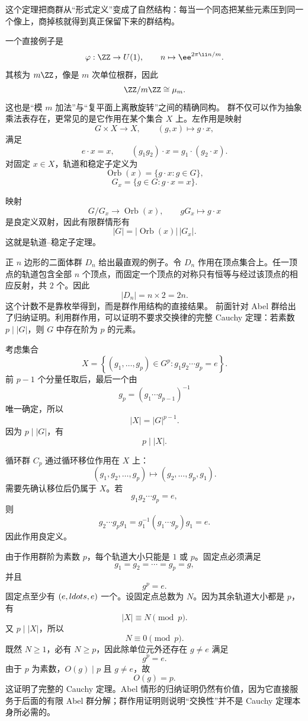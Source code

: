 这个定理把商群从“形式定义”变成了自然结构：每当一个同态把某些元素压到同一个像上，商掉核就得到真正保留下来的群结构。

一个直接例子是
\[
\varphi:\ZZ\to U(1),
\qquad
n\mapsto \ee^{2\pi\ii n/m}.
\]
其核为 $m\ZZ$，像是 $m$ 次单位根群，因此
\[
\ZZ/m\ZZ\cong \mu_m.
\]
这也是“模 $m$ 加法”与“复平面上离散旋转”之间的精确同构。
群不仅可以作为抽象乘法表存在，更常见的是它作用在某个集合 $X$ 上。左作用是映射
\[
G\times X\to X,
\qquad (g,x)\mapsto g\cdot x,
\]
满足
\[
e\cdot x=x,
\qquad
(g_1g_2)\cdot x=g_1\cdot(g_2\cdot x).
\]
对固定 $x\in X$，轨道和稳定子定义为
\[
\operatorname{Orb}(x)=\{g\cdot x:g\in G\},
\]
\[
G_x=\{g\in G:g\cdot x=x\}.
\]

映射
\[
G/G_x\to\operatorname{Orb}(x),
\qquad
gG_x\mapsto g\cdot x
\]
是良定义双射，因此有限群情形有
\begin{equation*}{
|G|=|\operatorname{Orb}(x)|\,|G_x|
}.\end{equation*}
这就是轨道--稳定子定理。

正 $n$ 边形的二面体群 $D_n$ 给出最直观的例子。令 $D_n$ 作用在顶点集合上。任一顶点的轨道包含全部 $n$ 个顶点，而固定一个顶点的对称只有恒等与经过该顶点的相应反射，共 $2$ 个。因此
\[
|D_n|=n\times2=2n.
\]
这个计数不是靠枚举得到，而是群作用结构的直接结果。
前面针对 Abel 群给出了归纳证明。利用群作用，可以证明不要求交换律的完整 Cauchy 定理：若素数 $p\mid|G|$，则 $G$ 中存在阶为 $p$ 的元素。

考虑集合
\[
X=\left\{(g_1,\ldots,g_p)\in G^p:
 g_1g_2\cdots g_p=e\right\}.
\]
前 $p-1$ 个分量任取后，最后一个由
\[
g_p=(g_1\cdots g_{p-1})^{-1}
\]
唯一确定，所以
\[
|X|=|G|^{p-1}.
\]
因为 $p\mid|G|$，有
\[
p\mid|X|.
\]

循环群 $C_p$ 通过循环移位作用在 $X$ 上：
\[
(g_1,g_2,\ldots,g_p)
\mapsto
(g_2,\ldots,g_p,g_1).
\]
需要先确认移位后仍属于 $X$。若
\[
g_1g_2\cdots g_p=e,
\]
则
\[
g_2\cdots g_pg_1
=g_1^{-1}(g_1\cdots g_p)g_1=e.
\]
因此作用良定义。

由于作用群阶为素数 $p$，每个轨道大小只能是 $1$ 或 $p$。固定点必须满足
\[
g_1=g_2=\cdots=g_p=g,
\]
并且
\[
g^p=e.
\]
固定点至少有 $(e,\\ldots,e)$ 一个。设固定点总数为 $N$。因为其余轨道大小都是 $p$，有
\[
|X|\equiv N\pmod p.
\]
又 $p\mid|X|$，所以
\[
N\equiv0\pmod p.
\]
既然 $N\ge1$，必有 $N\ge p$，因此除单位元外还存在 $g\neq e$ 满足
\[
g^p=e.
\]
由于 $p$ 为素数，$O(g)\mid p$ 且 $g\neq e$，故
\[
{O(g)=p}.
\]
这证明了完整的 Cauchy 定理。Abel 情形的归纳证明仍然有价值，因为它直接服务于后面的有限 Abel 群分解；群作用证明则说明“交换性”并不是 Cauchy 定理本身所必需的。

